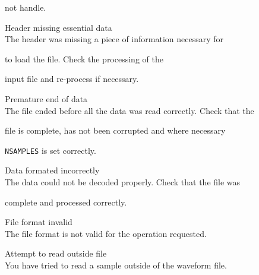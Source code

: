 \begin{itemize}
\begin{itemize}
        not handle.





    Header missing essential data\\


        The header was missing a piece of information necessary for 


         to load the file.  Check the processing of the 


        input file and re-process if necessary.





    Premature end of data\\


        The file ended before all the data was read correctly.  Check that the


        file is complete, has not been corrupted and where necessary 


        \texttt{NSAMPLES} is set correctly.





    Data formated incorrectly\\


        The data could not be decoded properly.  Check that the file was 


        complete and processed correctly.





    File format invalid\\


        The file format is not valid for the operation requested.





    Attempt to read outside file\\


        You have tried to read a sample outside of the waveform file.





\end{itemize}










\begin{itemize}



\end{itemize}
\end{itemize}
